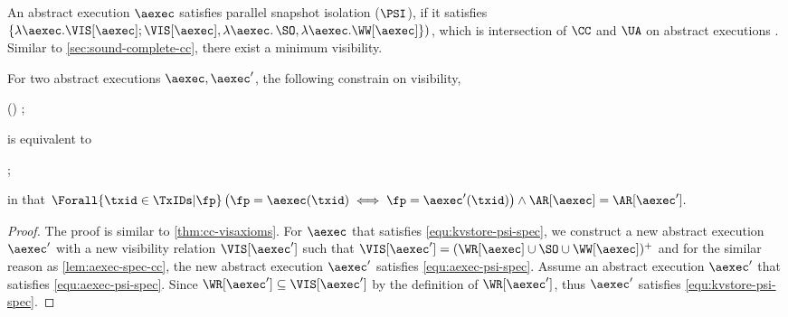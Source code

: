 An abstract execution \( \aexec \) satisfies parallel snapshot isolation (\(\PSI\)), 
if it satisfies
\( \{\lambda \aexec. \VIS[\aexec] ; \VIS[\aexec], \allowbreak \lambda \aexec \ldotp \SO, \lambda \aexec. \WW[\aexec] \}) \),
which is intersection of \( \CC \) and \( \UA \) on abstract executions \citep{psi-chopping}.
Similar to \cref{sec:sound-complete-cc}, there exist a minimum visibility.

\begin{theorem} 
\label{thm:aexec-spec-psi}
For two abstract executions \( \aexec,\aexec' \),
the following constrain on visibility,
\begin{Formulae}
\begin{Formula}
    (\WR[\aexec] \cup \WW[\aexec] \cup \SO ) ; \VIS[\aexec] \subseteq \VIS[\aexec] \qquad \SO \subseteq \VIS[\aexec] \qquad \WW[\aexec] \subseteq \VIS[\aexec]
    \label{equ:kvstore-psi-spec}
\end{Formula}
\end{Formulae}
is equivalent to
\begin{Formulae}
\begin{Formula}
    \VIS[\aexec'] ; \VIS[\aexec'] \subseteq \VIS[\aexec']  \qquad \SO \subseteq \VIS[\aexec'] \qquad \WW[\aexec] \subseteq \VIS[\aexec] 
    \label{equ:aexec-psi-spec}
\end{Formula}
\end{Formulae}
in that 
\(
    \Forall{\txid \in \TxIDs | \fp } \left( \fp = \aexec(\txid) \iff \fp = \aexec'(\txid) \right)
    \land \AR[\aexec] = \AR[\aexec'] .
\)
\end{theorem}
\begin{proof}
The proof is similar to \cref{thm:cc-visaxioms}.
For \( \aexec \) that satisfies \cref{equ:kvstore-psi-spec}, 
we construct a new abstract execution \( \aexec' \) 
with a new visibility relation \( \VIS[\aexec'] \) such that 
\( \VIS[\aexec'] = (\WR[\aexec] \cup \SO \cup \WW[\aexec])^{+} \)
and for the similar reason as \cref{lem:aexec-spec-cc}, the new abstract execution \( \aexec' \)
satisfies \cref{equ:aexec-psi-spec}.
Assume an abstract execution \( \aexec' \) that satisfies \cref{equ:aexec-psi-spec}.
Since \( \WR[\aexec'] \subseteq \VIS[\aexec']\) by the definition of \( \WR[\aexec']\),
thus \( \aexec' \) satisfies \cref{equ:kvstore-psi-spec}.
\end{proof}



